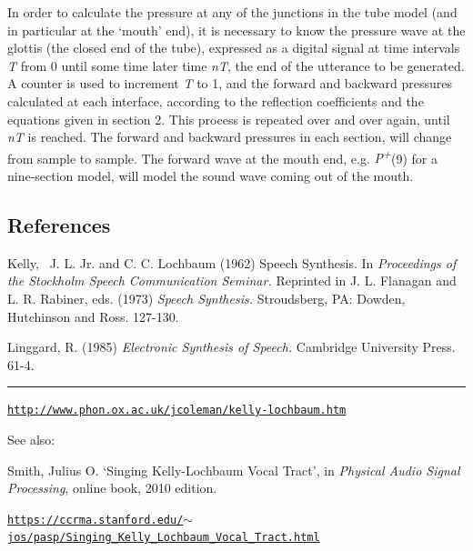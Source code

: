 In order to calculate the pressure at any of the junctions in the tube model (and in particular at the `mouth' end), it is necessary to know the pressure wave at the glottis (the closed end of the tube), expressed as a digital signal at time intervals \textit{T} from 0 until some time later time \textit{nT}, the end of the utterance to be generated. A counter is used to increment \textit{T} to 1, and the forward and backward pressures calculated at each interface, according to the reflection coefficients and the equations given in section 2. This process is repeated over and over again, until \textit{nT} is reached. The forward and backward pressures in each section, will change from sample to sample. The forward wave at the mouth end, e.g. \textit{P\textsuperscript{+}}(9) for a nine-section model, will model the sound wave coming out of the mouth.

\subsection*{References}

\noindent Kelly,~ J. L. Jr. and C. C. Lochbaum (1962) Speech Synthesis. In \textit{Proceedings of the Stockholm Speech Communication Seminar.} Reprinted in J. L. Flanagan and L. R. Rabiner, eds. (1973) \textit{Speech Synthesis.} Stroudsberg, PA: Dowden, Hutchinson and Ross. 127-130.

\bigskip

\noindent Linggard, R. (1985) \textit{Electronic Synthesis of Speech.} Cambridge University Press. 61-4.

\begin{center}\rule{0.5\linewidth}{0.5pt}\end{center}

 \href{http://www.phon.ox.ac.uk/jcoleman/kelly-lochbaum.htm}{\texttt{\footnotesize http://www.phon.ox.ac.uk/jcoleman/kelly-lochbaum.htm}}

\bigskip

See also:

\noindent Smith, Julius O. `Singing Kelly-Lochbaum Vocal Tract', in \textit{Physical Audio Signal Processing}, online book, 2010 edition.

\noindent \href{https://ccrma.stanford.edu/~jos/pasp/Singing\_Kelly\_Lochbaum\_Vocal\_Tract.html}{\texttt{\footnotesize https://ccrma.stanford.edu/$\sim$jos/pasp/Singing\_Kelly\_Lochbaum\_Vocal\_Tract.html}}
